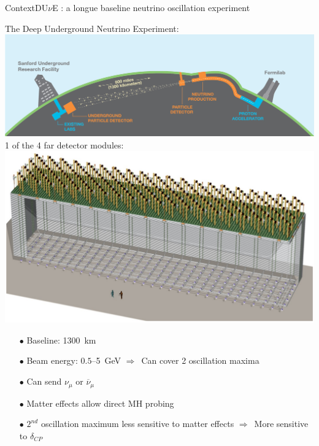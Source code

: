 \documentclass[10pt]{beamer}
\begin{document}
    \begin{frame}{Context}{DU$\nu$E : a longue baseline neutrino oscillation experiment}
    	\begin{scriptsize}
    	\begin{minipage}{0.58\textwidth}
    		The Deep Underground Neutrino Experiment:\\
    		\includegraphics[width=\textwidth]{figures/contexte/dune.jpg}\\
    		
    		1 of the 4 far detector modules:\\
    		\includegraphics[width=\textwidth]{figures/contexte/dune_module.png}\\
    	\end{minipage}
    	\hfill
    	\begin{minipage}{0.38\textwidth}
    		\begin{itemize}
    			\item[$\bullet$]Baseline: \SI{1300}{\kilo\meter}
    			\item[$\bullet$]Beam energy: $0.5$--\SI{5}{\giga\electronvolt} $\Rightarrow$~Can cover 2 oscillation maxima
    			\item[$\bullet$]Can send $\nu_{\mu}$ or $\overline{\nu}_{\mu}$
    			\item[$\bullet$] Matter effects allow direct MH probing
    			\item[$\bullet$] $2^{nd}$ oscillation maximum less sensitive to matter effects $\Rightarrow$~More sensitive to $\delta_{CP}$
    		\end{itemize}
	    \end{minipage}
	\end{scriptsize}
    \end{frame}
    
\end{document}
